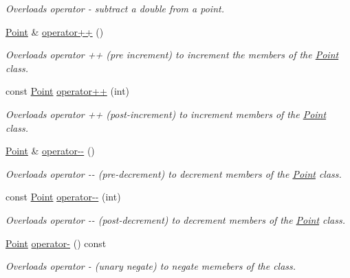\begin{DoxyCompactItemize}
\begin{DoxyCompactList}\small\item\em Overloads operator -\/ subtract a double from a point. \end{DoxyCompactList}\item 
\hyperlink{class_c_s170_1_1_point}{Point} \& \hyperlink{class_c_s170_1_1_point_adeb90df124d408692177522a068cc073}{operator++} ()
\begin{DoxyCompactList}\small\item\em Overloads operator ++ (pre increment) to increment the members of the \hyperlink{class_c_s170_1_1_point}{Point} class. \end{DoxyCompactList}\item 
const \hyperlink{class_c_s170_1_1_point}{Point} \hyperlink{class_c_s170_1_1_point_a7d49157fff15c6bc467362c3b01e161d}{operator++} (int)
\begin{DoxyCompactList}\small\item\em Overloads operator ++ (post-\/increment) to increment members of the \hyperlink{class_c_s170_1_1_point}{Point} class. \end{DoxyCompactList}\item 
\hyperlink{class_c_s170_1_1_point}{Point} \& \hyperlink{class_c_s170_1_1_point_a92965dd852d673aeef5096708648debe}{operator-\/-\/} ()
\begin{DoxyCompactList}\small\item\em Overloads operator -\/-\/ (pre-\/decrement) to decrement members of the \hyperlink{class_c_s170_1_1_point}{Point} class. \end{DoxyCompactList}\item 
const \hyperlink{class_c_s170_1_1_point}{Point} \hyperlink{class_c_s170_1_1_point_a766ac5dff0834a3cbc7ba2210b59f5bb}{operator-\/-\/} (int)
\begin{DoxyCompactList}\small\item\em Overloads operator -\/-\/ (post-\/decrement) to decrement members of the \hyperlink{class_c_s170_1_1_point}{Point} class. \end{DoxyCompactList}\item 
\hyperlink{class_c_s170_1_1_point}{Point} \hyperlink{class_c_s170_1_1_point_a49c167b90238a530997c116d097c1699}{operator-\/} () const 
\begin{DoxyCompactList}\small\item\em Overloads operator -\/ (unary negate) to negate memebers of the class. \end{DoxyCompactList}\item 

\end{DoxyCompactItemize}
